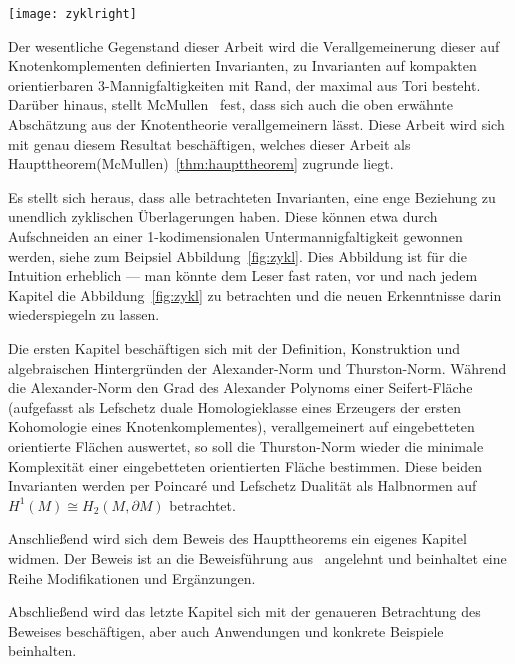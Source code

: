 	\hfill
	\begin{minipage}[t]{0.2\textwidth}
	\vfill \begin{flushright}
		\texttt{[image: zyklright]} 
	\end{flushright}
	\end{minipage}
    
	Der wesentliche Gegenstand dieser Arbeit wird die Verallgemeinerung dieser auf Knotenkomplementen definierten Invarianten, zu Invarianten auf kompakten orientierbaren 3-Mannigfaltigkeiten mit Rand, der maximal aus Tori besteht. Darüber hinaus, stellt McMullen~\cite{MCMULLEN.2002} fest, dass sich auch die oben erwähnte Abschätzung aus der Knotentheorie verallgemeinern lässt. Diese Arbeit wird sich mit genau diesem Resultat beschäftigen, welches dieser Arbeit als Haupttheorem(McMullen)~\ref{thm:haupttheorem} zugrunde liegt.

    Es stellt sich heraus, dass alle betrachteten Invarianten, eine enge Beziehung zu unendlich zyklischen Überlagerungen haben. Diese können etwa durch Aufschneiden an einer 1-kodimensionalen Untermannigfaltigkeit gewonnen werden, siehe zum Beipsiel Abbildung~\ref{fig:zykl}. Dies Abbildung ist für die Intuition erheblich --- man könnte dem Leser fast raten, vor und nach jedem Kapitel die Abbildung~\ref{fig:zykl} zu betrachten und die neuen Erkenntnisse darin wiederspiegeln zu lassen.

	Die ersten Kapitel beschäftigen sich mit der Definition, Konstruktion und algebraischen Hintergründen der Alexander-Norm und Thurston-Norm. Während die Alexander-Norm den Grad des Alexander Polynoms einer Seifert-Fläche (aufgefasst als Lefschetz duale Homologieklasse eines Erzeugers der ersten Kohomologie eines Knotenkomplementes), verallgemeinert auf eingebetteten orientierte Flächen auswertet, so soll die Thurston-Norm wieder die minimale Komplexität einer eingebetteten orientierten Fläche bestimmen. Diese beiden Invarianten werden per Poincaré und Lefschetz Dualität als Halbnormen auf $H^1(M) \cong H_2(M,\partial M)$ betrachtet.

	Anschließend wird sich dem Beweis des Haupttheorems ein eigenes Kapitel widmen. Der Beweis ist an die Beweisführung aus~\cite{MCMULLEN.2002} angelehnt und beinhaltet eine Reihe Modifikationen und Ergänzungen. 

	Abschließend wird das letzte Kapitel sich mit der genaueren Betrachtung des Beweises beschäftigen, aber auch Anwendungen und konkrete Beispiele beinhalten.

